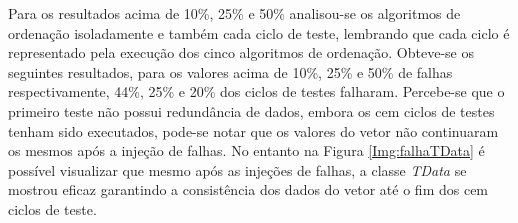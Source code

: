 

Para os resultados acima de 10\%, 25\% e 50\% analisou-se os algoritmos de ordenação isoladamente e também cada ciclo de teste, lembrando que cada ciclo é representado pela execução dos cinco algoritmos de ordenação. Obteve-se os seguintes resultados, para os valores acima de 10\%, 25\% e 50\% de falhas respectivamente, 44\%, 25\% e 20\% dos ciclos de testes falharam. Percebe-se que o primeiro teste não possui redundância de dados, embora os cem ciclos de testes tenham sido executados, pode-se notar que os valores do vetor não continuaram os mesmos após a injeção de falhas. No entanto na Figura \ref{Img:falhaTData} é possível visualizar que mesmo após as injeções de falhas, a classe \textit{TData} se mostrou eficaz garantindo a consistência dos dados do vetor até o fim dos cem ciclos de teste.


